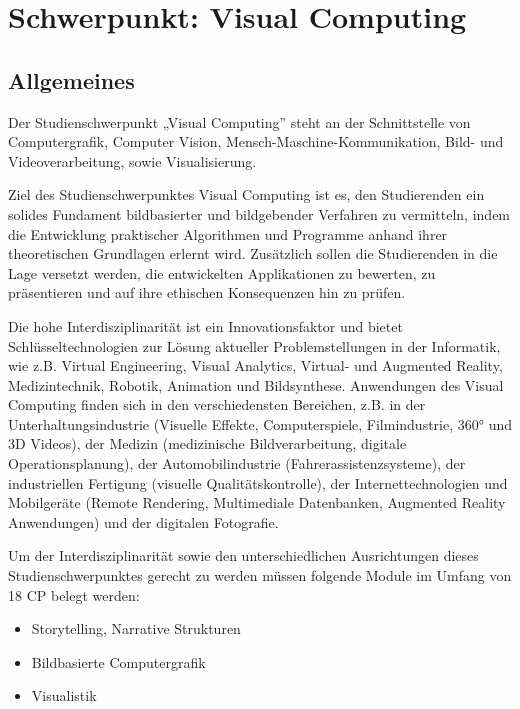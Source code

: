 \chapter{Schwerpunkt: Visual
Computing}\label{schwerpunkt-visual-computing}

\section*{Allgemeines}\label{allgemeines-2}

Der Studienschwerpunkt „Visual Computing'' steht an der Schnittstelle
von Computergrafik, Computer Vision, Mensch-Maschine-Kommunikation,
Bild- und Videoverarbeitung, sowie Visualisierung.

Ziel des Studienschwerpunktes Visual Computing ist es, den Studierenden
ein solides Fundament bildbasierter und bildgebender Verfahren zu
vermitteln, indem die Entwicklung praktischer Algorithmen und Programme
anhand ihrer theoretischen Grundlagen erlernt wird. Zusätzlich sollen
die Studierenden in die Lage versetzt werden, die entwickelten
Applikationen zu bewerten, zu präsentieren und auf ihre ethischen
Konsequenzen hin zu prüfen.

Die hohe Interdisziplinarität ist ein Innovationsfaktor und bietet
Schlüsseltechnologien zur Lösung aktueller Problemstellungen in der
Informatik, wie z.B. Virtual Engineering, Visual Analytics, Virtual- und
Augmented Reality, Medizintechnik, Robotik, Animation und Bildsynthese.
Anwendungen des Visual Computing finden sich in den verschiedensten
Bereichen, z.B. in der Unterhaltungsindustrie (Visuelle Effekte,
Computerspiele, Filmindustrie, 360° und 3D Videos), der Medizin
(medizinische Bildverarbeitung, digitale Operationsplanung), der
Automobilindustrie (Fahrerassistenzsysteme), der industriellen Fertigung
(visuelle Qualitätskontrolle), der Internettechnologien und Mobilgeräte
(Remote Rendering, Multimediale Datenbanken, Augmented Reality
Anwendungen) und der digitalen Fotografie.

Um der Interdisziplinarität sowie den unterschiedlichen Ausrichtungen
dieses Studienschwerpunktes gerecht zu werden müssen folgende Module im
Umfang von 18 CP belegt werden:

\begin{itemize}
\tightlist
\item
  Storytelling, Narrative Strukturen
\item
  Bildbasierte Computergrafik
\item
  Visualistik
\end{itemize}

